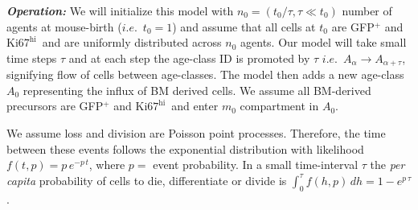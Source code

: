 \documentclass[11pt]{article}
\newcommand{\khi}{\ensuremath{\text{Ki67}^\text{hi}}~}
\newcommand\ie{$\textit{i.e.}$}
\begin{document}
\textbf{\textit{Operation:}}
We will initialize this model with $n_0 = (t_\text{0}{}/{\tau}, \tau \ll t_{0})$ number of agents at mouse-birth (\ie~$t_0=1$) and assume that all cells at $t_{0}$ are GFP$^{+}$ and \khi and are uniformly distributed across $n_0$ agents.
Our model will take small time steps $\tau$ and at each step the age-class ID is promoted by $\tau$ \ie~$A_\alpha \rightarrow A_{\alpha+\tau}$, signifying flow of cells between age-classes.
The model then adds a new age-class $A_0$ representing the influx of BM derived cells.
We assume all BM-derived precursors are GFP$^{+}$ and \khi and enter $m_0$ compartment in $A_0$. 

We assume loss and division are Poisson point processes.
Therefore, the time between these events follows the exponential distribution with likelihood $f(t, p)= p\,e^{-p\,t}$, where $p=$ event probability. 
In a small time-interval $\tau$ the \textit{per capita} probability of cells to die, differentiate or divide is  $\int_{0}^{\tau} f(h, p) \, dh = 1 - e^{p \,\tau}$. 
\end{document}

